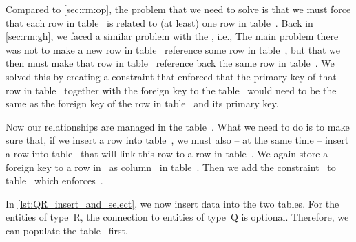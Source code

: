 Compared to \cref{sec:rm:op}, the problem that we need to solve is that we must force that each row in table~ is related to (at least) one row in table~.
Back in \cref{sec:rm:gh}, we faced a similar problem with the , i.e., 
The main problem there was not to make a new row in table~ reference some row in table~, but that we then must make that row in table~ reference back the same row in table~.
We solved this by creating a constraint that enforced that the primary key of that row in table~ together with the foreign key to the table~ would need to be the same as the foreign key of the row in table~ and its primary key.

Now our relationships are managed in the table~.
What we need to do is to make sure that, if we insert a row into table~, we must also -- at the same time -- insert a row into table~ that will link this row to a row in table~.
We again store a  foreign key to a row in~ as column~ in table~.
Then we add the constraint~ to table~ which enforces~.

In \cref{lst:QR_insert_and_select}, we now insert data into the two tables.
For the entities of type~R, the connection to entities of type~Q is optional.
Therefore, we can populate the table~ first.

